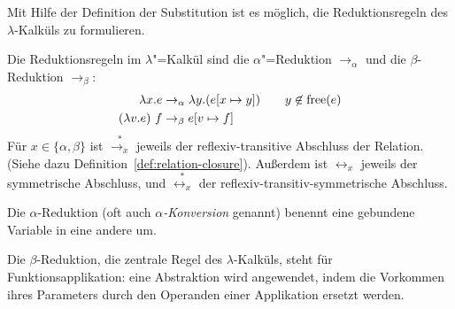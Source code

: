 Mit Hilfe der Definition der Substitution ist es möglich,
die Reduktionsregeln des $\lambda$-Kalküls zu formulieren. 
%
\begin{definition}[Reduktionsregeln]
  Die Reduktionsregeln im $\lambda$"=Kalkül sind
  die $\alpha$"=Reduktion $\rightarrow_{\alpha}$ und die
  $\beta$-Reduktion $\rightarrow_{\beta}$:%
  \begin{alignat*}{2}
    \lambda x.e & \rightarrow_{\alpha} \lambda y.(e[x\mapsto y]) \quad 
    & y\not\in\operatorname{free}(e)
    \\
    (\lambda v.e)~f & \rightarrow_{\beta} e[v\mapsto f]
  \end{alignat*}
  Für $x\in\{\alpha,\beta\}$ ist $\overset{\ast}{\rightarrow_x}$
  jeweils der reflexiv-transitive Abschluss der Relation.  (Siehe dazu
  Definition~\ref{def:relation-closure}). %
  Außerdem ist
  $\leftrightarrow_x$ jeweils der symmetrische Abschluss, und
  $\overset{\ast}{\leftrightarrow_x}$ der
  reflexiv-transitiv-symmetrische Abschluss.
\end{definition}
%
Die $\alpha$-Reduktion (oft auch \textit{$\alpha$-Konversion} genannt)
benennt eine gebundene Variable in eine andere um.

Die $\beta$-Reduktion, die zentrale Regel des $\lambda$-Kalküls, steht für
Funktionsapplikation: eine Abstraktion
wird angewendet, indem die Vorkommen ihres Parameters durch den
Operanden einer Applikation ersetzt werden.


